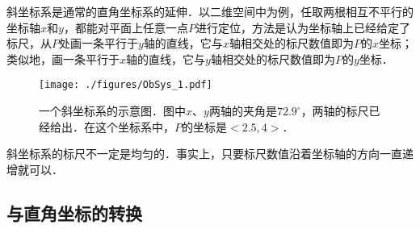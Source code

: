 

斜坐标系是通常的直角坐标系的延伸．以二维空间中为例，任取两根相互不平行的坐标轴$x$和$y$，都能对平面上任意一点$P$进行定位，方法是认为坐标轴上已经给定了标尺，从$P$处画一条平行于$y$轴的直线，它与$x$轴相交处的标尺数值即为$P$的$x$坐标；类似地，画一条平行于$x$轴的直线，它与$y$轴相交处的标尺数值即为$P$的$y$坐标．

\begin{figure}[ht]
\centering
\texttt{[image: ./figures/ObSys\_1.pdf]}
\caption{一个斜坐标系的示意图．图中$x$、$y$两轴的夹角是$72.9^\circ$，两轴的标尺已经给出．在这个坐标系中，$P$的坐标是$<2.5, 4>$．} \label{ObSys_fig1}
\end{figure}

斜坐标系的标尺不一定是均匀的．事实上，只要标尺数值沿着坐标轴的方向一直递增就可以．

\subsection{与直角坐标的转换}

